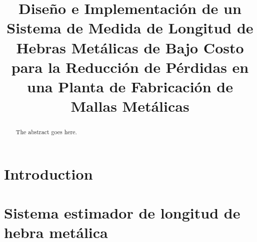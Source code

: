 \documentclass[conference]{IEEEtran}
\begin{document}
%
\title{
  Diseño e Implementación de un Sistema de Medida de Longitud de
  Hebras Metálicas de Bajo Costo para la Reducción de Pérdidas
  en una Planta de Fabricación de Mallas Metálicas
}


\author{
  \and
}



\maketitle


\begin{abstract}
The abstract goes here.
\end{abstract}


%
\IEEEpeerreviewmaketitle

\section{Introduction}


\section{Sistema estimador de longitud de hebra metálica}

\end{document}
